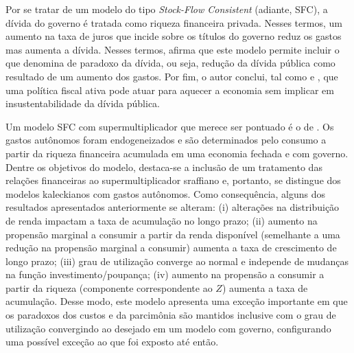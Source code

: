 Por se tratar de um modelo do tipo \textit{Stock-Flow Consistent} (adiante, SFC), a dívida do governo é tratada como riqueza financeira privada. Nesses termos, um aumento na taxa de juros que incide sobre os títulos do governo reduz os gastos mas aumenta a dívida. Nesses termos, \textcite{hein_autonomous_2018} afirma que este modelo permite incluir o que denomina de paradoxo da dívida, ou seja, redução da dívida pública como resultado de um aumento dos gastos. Por fim, o autor conclui, tal como \textcite[Capítulo 11]{godley_growth_2011} e \textcite{arestis_effectiveness_2012}, que uma política fiscal ativa pode atuar para aquecer a economia sem implicar em insustentabilidade da dívida pública.

Um modelo SFC com supermultiplicador que merece ser pontuado é o de \textcite{brochier_supermultiplier_2018}. Os gastos autônomos foram endogeneizados e são determinados pelo consumo a partir da riqueza financeira acumulada em uma economia fechada e com governo. Dentre os objetivos do modelo, destaca-se a inclusão de um tratamento das relações financeiras ao supermultiplicador sraffiano e, portanto, se distingue dos modelos kaleckianos com gastos autônomos. Como consequência, alguns dos resultados apresentados anteriormente se alteram: (i) alterações na distribuição de renda impactam a taxa de acumulação no longo prazo; (ii) aumento na propensão marginal a consumir a partir da renda disponível (semelhante a uma redução na propensão marginal a consumir) aumenta a taxa de crescimento de longo prazo; (iii) grau de utilização converge ao normal e independe de mudanças na função investimento/poupança; (iv) aumento na propensão a consumir a partir da riqueza (componente correspondente ao $Z$) aumenta a taxa de acumulação. Desse modo, este modelo apresenta uma exceção importante em que os paradoxos dos custos e da parcimônia são mantidos inclusive com o grau de utilização convergindo ao desejado em um modelo com governo, configurando uma possível exceção ao que foi exposto até então.



